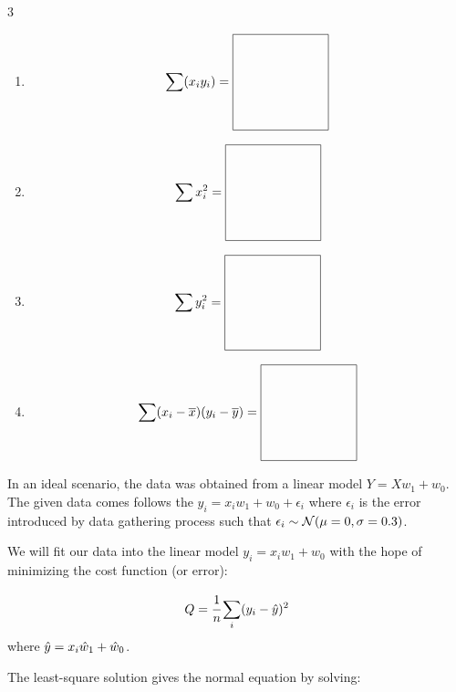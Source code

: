 \documentclass[12pt, xcolor=dvipsnames,svgnames,x11names]{article}
\begin{document}
\begin{multicols}{3}
\begin{enumerate}
\item \begin{equation*}
     \sum (x_i y_i) = \vcenter{\hbox{\begin{tikzpicture}
    \draw (0,0) rectangle (75pt,75pt);
    \end{tikzpicture}}}
    \end{equation*}

\item \begin{equation*}
     \sum x_i^2 = \vcenter{\hbox{\begin{tikzpicture}
    \draw (0,0) rectangle (75pt,75pt);
    \end{tikzpicture}}}
    \end{equation*}

\item \begin{equation*}
     \sum y_i^2 = \vcenter{\hbox{\begin{tikzpicture}
    \draw (0,0) rectangle (75pt,75pt);
    \end{tikzpicture}}}
    \end{equation*}

\item \begin{equation*}
     \sum (x_i - \xbar) (y_i - \ybar) = \vcenter{\hbox{\begin{tikzpicture}
    \draw (0,0) rectangle (75pt,75pt);
    \end{tikzpicture}}}
    \end{equation*}
        
\end{enumerate}
\end{multicols}

In an ideal scenario, the data was obtained from a linear model $Y = Xw_1 + w_0$. The given data comes follows the $y_i = x_i w_1 + w_0 + \epsilon_i$ where $\epsilon_i$ is the error introduced by data gathering process such that $\epsilon_i \sim {\mathcal N}(\mu= 0, \sigma=0.3)$. 

We will fit our data into the linear model $y_i=x_i w_1 + w_0$ with the hope of minimizing the cost function (or error):

\begin{equation}
    Q = \cfrac{1}{n}\sum_i (y_i -{\hat y})^2
\end{equation}
where ${\hat y} = x_i {\hat w}_1 + {\hat w}_0$.

The least-square solution gives the normal equation by solving:
\end{document}
